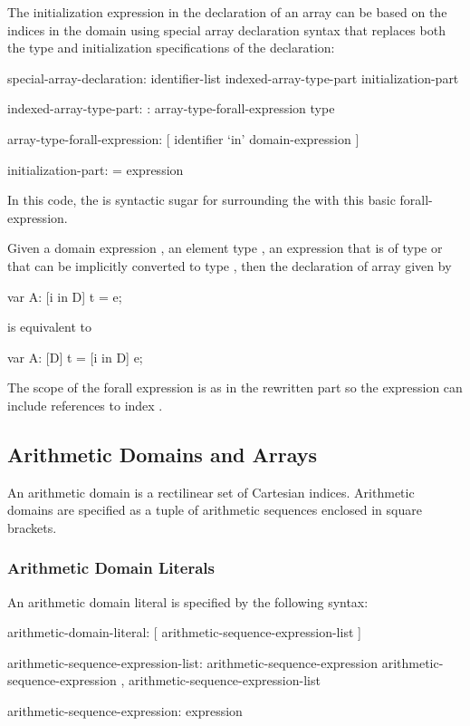 The initialization expression in the declaration of an array can be
based on the indices in the domain using special array declaration
syntax that replaces both the type and initialization specifications
of the declaration:
\begin{syntax}
special-array-declaration:
  identifier-list indexed-array-type-part initialization-part

indexed-array-type-part:
  : array-type-forall-expression type

array-type-forall-expression:
  [ identifier `in' domain-expression ]

initialization-part:
  = expression
\end{syntax}
In this code, the  is syntactic
sugar for surrounding the  with this basic
forall-expression.

Given a domain expression , an element type , an
expression  that is of type  or that can be implicitly
converted to type , then the declaration of array 
given by
\begin{chapel}
var A: [i in D] t = e;
\end{chapel}
is equivalent to
\begin{chapel}
var A: [D] t = [i in D] e;
\end{chapel}
The scope of the forall expression is as in the rewritten part so the
expression  can include references to index .

\subsection{Arithmetic Domains and Arrays}
\label{Arithmetic_Domains_and_Arrays}

An arithmetic domain is a rectilinear set of Cartesian indices.
Arithmetic domains are specified as a tuple of arithmetic sequences
enclosed in square brackets.

\subsubsection{Arithmetic Domain Literals}
\label{Arithmetic_Domain_Literals}

An arithmetic domain literal is specified by the following syntax:
\begin{syntax}
arithmetic-domain-literal:
  [ arithmetic-sequence-expression-list ]

arithmetic-sequence-expression-list:
  arithmetic-sequence-expression
  arithmetic-sequence-expression , arithmetic-sequence-expression-list

arithmetic-sequence-expression:
  expression
\end{syntax}

